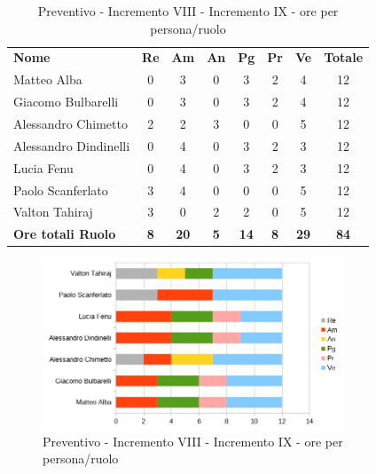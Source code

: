 \begin{table} [h!]
	\begin{center}
		\begin{tabular} { m{3.5cm} c c c c c c c }
			\rowcolor{lightgray}
			\textbf{Nome} & \textbf{Re} & \textbf{Am} & \textbf{An} & \textbf{Pg} & \textbf{Pr} & \textbf{Ve} & \textbf{Totale} \\
			Matteo Alba &0 &3 & 0& 3 &2 & 4 & 12 \\
			Giacomo Bulbarelli & 0&3 & 0& 3 & 2 & 4 & 12 \\
			Alessandro Chimetto & 2 & 2& 3& 0 & 0 & 5& 12 \\
			Alessandro Dindinelli & 0& 4 & 0& 3 & 2 &3 & 12 \\
			Lucia Fenu & 0& 4 & 0& 3 & 2 &3 & 12 \\
			Paolo Scanferlato &3 & 4 &0 & 0 & 0 & 5 & 12\\
			Valton Tahiraj & 3& 0 &2 & 2 & 0 & 5 & 12 \\
			\textbf{Ore totali Ruolo} & \textbf{8} & \textbf{20} & \textbf{5} & \textbf{14} & \textbf{8}& \textbf{29} & \textbf{84}
		\end{tabular}
		\caption{Preventivo - Incremento VIII - Incremento IX - ore per persona/ruolo}
	\end{center}
\end{table}
\begin{figure} [h!]
	\centering
	\includegraphics[width=0.8\textwidth]{res/img/preventivi/8e9-barre.png}
	\caption{Preventivo - Incremento VIII - Incremento IX - ore per persona/ruolo} 
\end{figure}

\newpage
